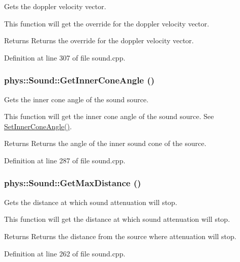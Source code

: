 Gets the doppler velocity vector. 

This function will get the override for the doppler velocity vector. \begin{DoxyReturn}{Returns}
Returns the override for the doppler velocity vector. 
\end{DoxyReturn}


Definition at line 307 of file sound.cpp.

\hypertarget{classphys_1_1Sound_a5e39752133cd5d8d160455bbbcb360fd}{
\subsubsection[{GetInnerConeAngle}]{ phys::Sound::GetInnerConeAngle ()}}
\label{dc/d2f/classphys_1_1Sound_a5e39752133cd5d8d160455bbbcb360fd}


Gets the inner cone angle of the sound source. 

This function will get the inner cone angle of the sound source. See \hyperlink{classphys_1_1Sound_ae231936d44db727eb48f9ff259ae0dd6}{SetInnerConeAngle()}. \begin{DoxyReturn}{Returns}
Returns the angle of the inner sound cone of the source. 
\end{DoxyReturn}


Definition at line 287 of file sound.cpp.

\hypertarget{classphys_1_1Sound_a5a9868c589bf85bf1775481e0c8fe4d3}{
\subsubsection[{GetMaxDistance}]{ phys::Sound::GetMaxDistance ()}}
\label{dc/d2f/classphys_1_1Sound_a5a9868c589bf85bf1775481e0c8fe4d3}


Gets the distance at which sound attenuation will stop. 

This function will get the distance at which sound attenuation will stop. \begin{DoxyReturn}{Returns}
Returns the distance from the source where attenuation will stop. 
\end{DoxyReturn}


Definition at line 262 of file sound.cpp.

